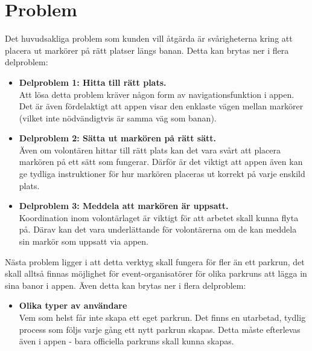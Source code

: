 \section{Problem}
Det huvudsakliga problem som kunden vill åtgärda är svårigheterna kring att placera ut markörer på rätt platser längs banan. Detta kan brytas ner i flera delproblem:
\begin{itemize}
    \item \textbf{Delproblem 1: Hitta till rätt plats.}\\
        Att lösa detta problem kräver någon form av navigationsfunktion i appen. Det är även fördelaktigt att appen visar den enklaste vägen mellan markörer (vilket inte nödvändigtvis är samma väg som banan).  
    \item \textbf{Delproblem 2: Sätta ut markören på rätt sätt.}\\
        Även om volontären hittar till rätt plats kan det vara svårt att placera markören på ett sätt som fungerar. Därför är det viktigt att appen även kan ge tydliga instruktioner för hur markören placeras ut korrekt på varje enskild plats. 
    \item \textbf{Delproblem 3: Meddela att markören är uppsatt.}\\
        Koordination inom volontärlaget är viktigt för att arbetet skall kunna flyta på. Därav kan det vara underlättande för volontärerna om de kan meddela sin markör som uppsatt via appen.
\end{itemize}
Nästa problem ligger i att detta verktyg skall fungera för fler än ett parkrun, det skall alltså finnas möjlighet för event-organisatörer för olika parkruns att lägga in sina banor i appen. Även detta kan brytas ner i flera delproblem:
\begin{itemize}
    \item \textbf{Olika typer av användare}\\
        Vem som helst får inte skapa ett eget parkrun. Det finns en utarbetad, tydlig process som följs varje gång ett nytt parkrun skapas. Detta måste efterlevas även i appen - bara officiella parkruns skall kunna skapas. 
\end{itemize}